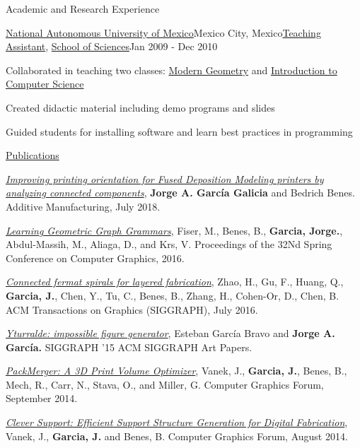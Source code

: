 \documentclass{resume} %
\begin{document}
\begin{rSection}{Academic and Research Experience}
	\begin{rSubsection}{\href{http://www.unam.mx}{National Autonomous University of Mexico}}{Mexico City, Mexico}{\href{http://www.fciencias.unam.mx/directorio/63922}{Teaching Assistant}, \href{http://www.fciencias.unam.mx/}{School of Sciences}}{Jan 2009 - Dec 2010}
	\item Collaborated in teaching two classes: \href{http://www.fciencias.unam.mx/licenciatura/asignaturas/217/249}{Modern Geometry} and \href{http://www.fciencias.unam.mx/licenciatura/asignaturas/2017/1236}{Introduction to Computer Science}
	\item Created didactic material including demo programs and slides
	\item Guided students for installing software and learn best practices in programming
	\end{rSubsection}

\end{rSection}

\begin{rSection}{\href{http://scholar.google.com/citations?hl=en&user=p2dAy1MAAAAJ}{Publications}} \itemsep 1pt
\item \textit{\href{http://www.sciencedirect.com/science/article/pii/S2214860417302555}{Improving printing orientation for Fused Deposition Modeling printers by analyzing connected components}}, {\bf Jorge A. García Galicia} and Bedrich Benes. Additive Manufacturing, July 2018.
\item \textit{\href{http://dl.acm.org/doi/abs/10.1145/2948628.2948635}{Learning Geometric Graph Grammars}}, Fiser, M., Benes, B., {\bf Garcia, Jorge.}, Abdul-Massih, M., Aliaga, D., and Krs, V. Proceedings of the 32Nd Spring Conference on Computer Graphics, 2016.
\item \textit{\href{http://dl.acm.org/doi/abs/10.1145/2897824.2925958}{Connected fermat spirals for layered fabrication}}, Zhao, H., Gu, F., Huang, Q., {\bf Garcia, J.}, Chen, Y., Tu, C., Benes, B., Zhang, H., Cohen-Or, D., Chen, B. ACM Transactions on Graphics (SIGGRAPH), July 2016.
\item \textit{\href{http://www.mitpressjournals.org/doi/abs/10.1162/LEON_a_01090}{Yturralde: impossible figure generator}}, Esteban Garc\'{i}a Bravo and {\bf Jorge A. Garc\'{i}a.} SIGGRAPH '15 ACM SIGGRAPH Art Papers.
\item \textit{\href{http://onlinelibrary.wiley.com/doi/abs/10.1111/cgf.12353}{PackMerger: A 3D Print Volume Optimizer}}, Vanek, J., {\bf Garcia, J.}, Benes, B., Mech, R., Carr, N., Stava, O., and Miller, G. Computer Graphics Forum, September 2014.
\item \textit{\href{http://onlinelibrary.wiley.com/doi/abs/10.1111/cgf.12437}{Clever Support: Efficient Support Structure Generation for Digital Fabrication}}, Vanek, J., {\bf Garcia, J.} and Benes, B. Computer Graphics Forum, August 2014.
\end{rSection}
\end{document}
